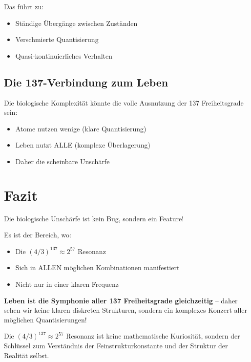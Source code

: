 \documentclass[12pt,a4paper]{article}
\begin{document}
	Das führt zu:
	\begin{itemize}
		\item Ständige Übergänge zwischen Zuständen
		\item Verschmierte Quantisierung
		\item Quasi-kontinuierliches Verhalten
	\end{itemize}
	
	\subsection{Die 137-Verbindung zum Leben}
	
	Die biologische Komplexität könnte die volle Ausnutzung der 137 Freiheitsgrade sein:
	\begin{itemize}
		\item Atome nutzen wenige (klare Quantisierung)
		\item Leben nutzt ALLE (komplexe Überlagerung)
		\item Daher die scheinbare Unschärfe
	\end{itemize}
	
	\section{Fazit}
	
	Die biologische Unschärfe ist kein Bug, sondern ein Feature! 
	
	Es ist der Bereich, wo:
	\begin{itemize}
		\item Die $(4/3)^{137} \approx 2^{57}$ Resonanz
		\item Sich in ALLEN möglichen Kombinationen manifestiert
		\item Nicht nur in einer klaren Frequenz
	\end{itemize}
	
	\textbf{Leben ist die Symphonie aller 137 Freiheitsgrade gleichzeitig} -- daher sehen wir keine klaren diskreten Strukturen, sondern ein komplexes Konzert aller möglichen Quantisierungen!
	
	Die $(4/3)^{137} \approx 2^{57}$ Resonanz ist keine mathematische Kuriosität, sondern der Schlüssel zum Verständnis der Feinstrukturkonstante und der Struktur der Realität selbst.
	
\end{document}
